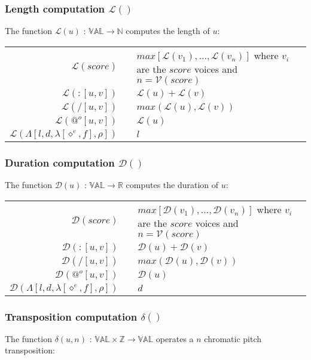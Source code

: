 \documentclass[10pt,a4paper,frenchb]{article}
\makeatletter
\newcommand{\seq}{:}
\newcommand{\var}[1]{\diamond^#1}
\newcommand{\val}{\mathbb{VAL}}
\newcommand{\closure}{\Lambda}
\newcommand{\noredex}{@^o}
\newcommand{\f}[3]{$#1 \times #2 \rightarrow #3$}
\newcommand{\envsym}{\rho}
\newcommand{\closenv}[4][\var{e}]{\closure[#3,#4,\lambda[#1,#2],\envsym]}
\newcommand{\length}	{{\mathcal L}}
\newcommand{\voices}	{{\mathcal V}}
\newcommand{\dur}		{{\mathcal D}}
\newcommand{\transp}	{\delta}
\makeatother
\begin{document}
\subsubsection{Length computation $\length()$}
The function $\length(u)$ : $\val \rightarrow \mathbb{N}$ computes the length of $u$:

\begin{center}
\begin{tabular}{rc@{ $\rightarrow$ }l}
 \hline
 $\length(score)$				& & $max[\length(v_1),...,\length(v_n)]$ where $v_i$ are the $score$ voices and $n=\voices(score)$ \\
 $\length(\seq [u,v])$		& & $\length(u) + \length(v)$ \\
 $\length(/ [u,v])$ 			& & $max(\length(u), \length(v))$ \\
 $\length(\noredex [u,v])$ 	& & $\length(u)$ \\
 $\length(\closenv{f}{l}{d})$ 	& & $l$ \\
 \hline
\end{tabular}
\end{center}

\subsubsection{Duration computation $\dur()$}
The function $\dur(u)$ : $\val \rightarrow \mathbb{R}$ computes the duration of $u$:

\begin{center}
\begin{tabular}{rc@{ $\rightarrow$ }l}
 \hline
 $\dur(score)$				& & $max[\dur(v_1),..., \dur(v_n)]$ where $v_i$ are the $score$ voices and $n=\voices(score)$\\
 $\dur(\seq [u,v])$		& & $\dur(u) + \dur(v)$ \\
 $\dur(/ [u,v])$ 			& & $max(\dur(u), \dur(v))$ \\
 $\dur(\noredex [u,v])$ 	& & $\dur(u)$ \\
 $\dur(\closenv{f}{l}{d})$ 	& & $d$ \\
 \hline
\end{tabular}
\end{center}

\subsubsection{Transposition computation $\transp()$}
The function $\transp(u,n)$ :  \f{\val}{\mathbb{Z}}{\val} operates a $n$ chromatic pitch transposition:
\end{document}
